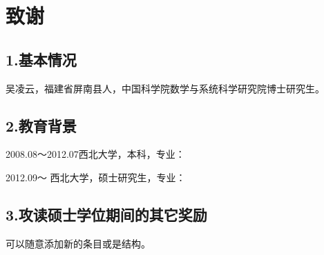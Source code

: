 \chapter{致谢}\label{acknowledgement}

\section*{1.基本情况}

吴凌云，福建省屏南县人，中国科学院数学与系统科学研究院博士研究生。

\section*{2.教育背景}

2008.08～2012.07西北大学，本科，专业：

2012.09～       西北大学，硕士研究生，专业：

\section*{3.攻读硕士学位期间的其它奖励}

可以随意添加新的条目或是结构。


\cleardoublepage[plain]%
